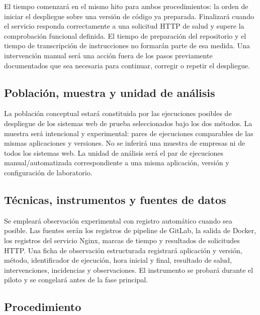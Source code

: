 \documentclass[12pt,a4paper]{article}
\begin{document}
El tiempo comenzará en el mismo hito para ambos procedimientos: la orden de iniciar el despliegue sobre una versión de código ya preparada. Finalizará cuando el servicio responda correctamente a una solicitud HTTP de salud y supere la comprobación funcional definida. El tiempo de preparación del repositorio y el tiempo de transcripción de instrucciones no formarán parte de esa medida. Una intervención manual será una acción fuera de los pasos previamente documentados que sea necesaria para continuar, corregir o repetir el despliegue.

\subsection{Población, muestra y unidad de análisis}

La población conceptual estará constituida por las ejecuciones posibles de despliegue de los sistemas web de prueba seleccionados bajo los dos métodos. La muestra será intencional y experimental: pares de ejecuciones comparables de las mismas aplicaciones y versiones. No se inferirá una muestra de empresas ni de todos los sistemas web. La unidad de análisis será el par de ejecuciones manual/automatizada correspondiente a una misma aplicación, versión y configuración de laboratorio.

\subsection{Técnicas, instrumentos y fuentes de datos}

Se empleará observación experimental con registro automático cuando sea posible. Las fuentes serán los registros de pipeline de GitLab, la salida de Docker, los registros del servicio Nginx, marcas de tiempo y resultados de solicitudes HTTP. Una ficha de observación estructurada registrará aplicación y versión, método, identificador de ejecución, hora inicial y final, resultado de salud, intervenciones, incidencias y observaciones. El instrumento se probará durante el piloto y se congelará antes de la fase principal.

\subsection{Procedimiento}
\end{document}
